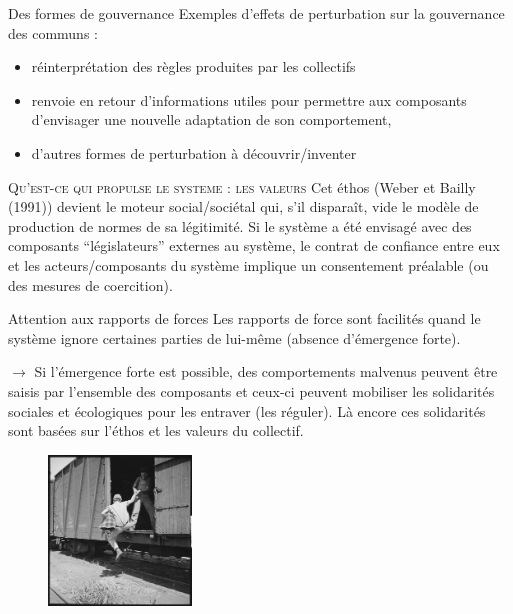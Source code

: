 \documentclass[newPxFont]{beamer}
\begin{document}
\begin{frame}[c]{Des formes de gouvernance}
\vspace{-1cm}
Exemples d'effets de perturbation sur la gouvernance des communs :
\begin{itemize}
  \item  réinterprétation des règles produites par les collectifs
  \item  renvoie en retour d’informations utiles pour permettre aux composants d’envisager une nouvelle adaptation de son comportement,
  \item d'autres formes de perturbation à découvrir/inventer
\end{itemize}

 \small{
   \begin{alertblock}{\textsc{Qu'est-ce qui propulse le systeme : les valeurs }}
    Cet éthos (Weber et Bailly (1991)) devient le moteur social/sociétal qui, s’il disparaît, vide le modèle de production de normes de sa légitimité. Si le système a été envisagé avec des composants “législateurs” externes au système, le contrat de confiance entre eux et les acteurs/composants du système implique un consentement préalable (ou des mesures de coercition).
   \end{alertblock}
 }
\end{frame}

\begin{frame}[c]{Attention aux rapports de forces}
\vspace{-1cm}
Les rapports de force sont facilités quand le système ignore certaines parties de lui-même (absence d'émergence forte).

$\rightarrow$  Si l'émergence forte est possible, des comportements malvenus peuvent être saisis par l’ensemble des composants et ceux-ci peuvent mobiliser les solidarités sociales et écologiques pour les entraver (les réguler). Là encore ces solidarités sont basées sur l’éthos et les valeurs du collectif.

\begin{figure}
  \includegraphics[height=4cm]{img/valeurs.jpg}
\end{figure}


\end{frame}
\end{document}
